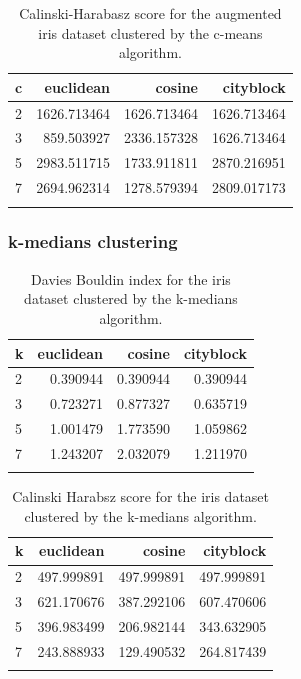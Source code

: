 \documentclass[conference]{IEEEtran}
\begin{document}
\begin{table}[ht!]
    \centering
    \begin{tabular}{lrrr}
\toprule
c &    euclidean &       cosine &    cityblock \\
\midrule
2 &  1626.713464 &  1626.713464 &  1626.713464 \\
3 &   859.503927 &  2336.157328 &  1626.713464 \\
5 &  2983.511715 &  1733.911811 &  2870.216951 \\
7 &  2694.962314 &  1278.579394 &  2809.017173 \\
\bottomrule \\
\end{tabular}
    \caption{Calinski-Harabasz score for the augmented iris dataset clustered by the c-means algorithm.}
    \label{tab:ie_ch_c}
\end{table}

\subsubsection{k-medians clustering}

\begin{table}[ht!]
    \centering
    \begin{tabular}{lrrr}
        \toprule
        k &  euclidean &    cosine &  cityblock \\
        \midrule
        2 &   0.390944 &  0.390944 &   0.390944 \\
        3 &   0.723271 &  0.877327 &   0.635719 \\
        5 &   1.001479 &  1.773590 &   1.059862 \\
        7 &   1.243207 &  2.032079 &   1.211970 \\
        \bottomrule\\
        \end{tabular}
    \caption{Davies Bouldin index for the iris dataset clustered by the k-medians algorithm.}
    \label{tab:i1_db_k}
\end{table}

\begin{table}[ht!]
    \centering
   \begin{tabular}{lrrr}
    \toprule
    k &   euclidean &      cosine &   cityblock \\
    \midrule
    2 &  497.999891 &  497.999891 &  497.999891 \\
    3 &  621.170676 &  387.292106 &  607.470606 \\
    5 &  396.983499 &  206.982144 &  343.632905 \\
    7 &  243.888933 &  129.490532 &  264.817439 \\
    \bottomrule \\
    \end{tabular}
    \caption{Calinski Harabsz score for the iris dataset clustered by the k-medians algorithm.}
    \label{tab:i1_ch_k}
    \end{table}
    
\end{document}
